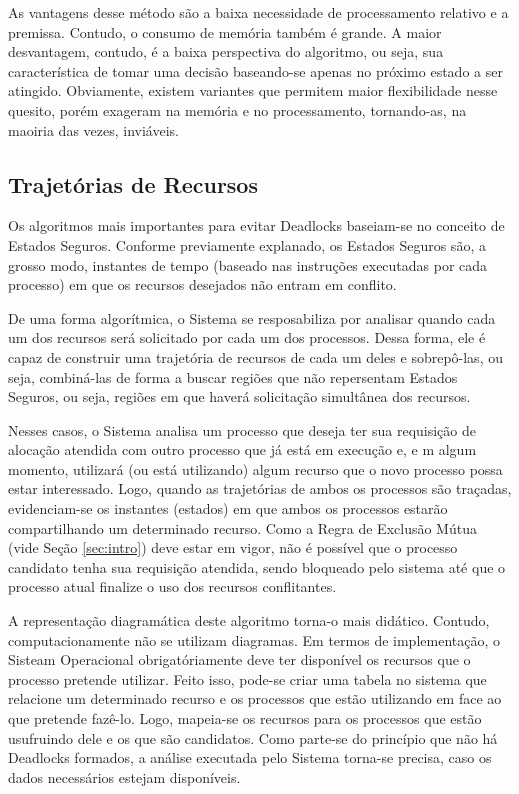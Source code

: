 	As vantagens desse método são a baixa necessidade de processamento relativo e a premissa. Contudo, o consumo de memória também é grande. A maior desvantagem, contudo, é a baixa perspectiva do algoritmo, ou seja, sua característica de tomar uma decisão baseando-se apenas no próximo estado a ser atingido. Obviamente, existem variantes que permitem maior flexibilidade nesse quesito, porém exageram na memória e no processamento, tornando-as, na maoiria das vezes, inviáveis.

	\subsection{Trajetórias de Recursos}
	Os algoritmos mais importantes para evitar Deadlocks baseiam-se no conceito de Estados Seguros. Conforme previamente explanado, os Estados Seguros são, a grosso modo, instantes de tempo (baseado nas instruções executadas por cada processo) em que os recursos desejados não entram em conflito.

	De uma forma algorítmica, o Sistema se resposabiliza por analisar quando cada um dos recursos será solicitado por cada um dos processos. Dessa forma, ele é capaz de construir uma trajetória de recursos de cada um deles e sobrepô-las, ou seja, combiná-las de forma a buscar regiões que não repersentam Estados Seguros, ou seja, regiões em que haverá solicitação simultânea dos recursos.

	Nesses casos, o Sistema analisa um processo que deseja ter sua requisição de alocação atendida com outro processo que já está em execução e, e m algum momento, utilizará (ou está utilizando) algum recurso que o novo processo possa estar interessado. Logo, quando as trajetórias de ambos os processos são traçadas, evidenciam-se os instantes (estados) em que ambos os processos estarão compartilhando um determinado recurso. Como a Regra de Exclusão Mútua (vide Seção \ref{sec:intro}) deve estar em vigor, não é possível que o processo candidato tenha sua requisição atendida, sendo bloqueado pelo sistema até que o processo atual finalize o uso dos recursos conflitantes.

	A representação diagramática deste algoritmo torna-o mais didático. Contudo, computacionamente não se utilizam diagramas. Em termos de implementação, o Sisteam Operacional obrigatóriamente deve ter disponível os recursos que o processo pretende utilizar. Feito isso, pode-se criar uma tabela no sistema que relacione um determinado recurso e os processos que estão utilizando em face ao que pretende fazê-lo. Logo, mapeia-se os recursos para os processos que estão usufruindo dele e os que são candidatos. Como parte-se do princípio que não há Deadlocks formados, a análise executada pelo Sistema torna-se precisa, caso os dados necessários estejam disponíveis.

